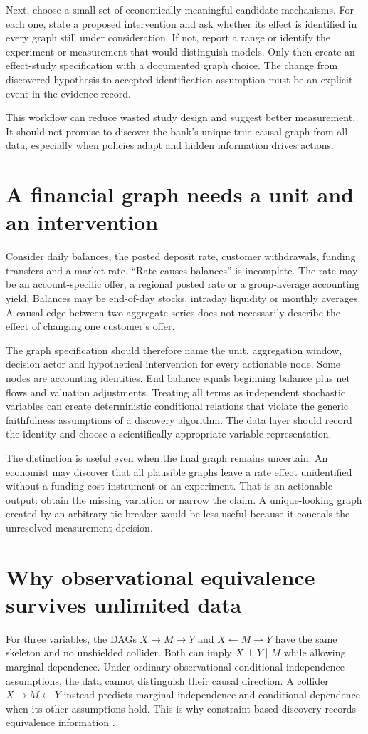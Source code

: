 Next, choose a small set of economically meaningful candidate mechanisms.
For each one, state a proposed intervention and ask whether its effect is
identified in every graph still under consideration. If not, report a range
or identify the experiment or measurement that would distinguish models.
Only then create an effect-study specification with a documented graph
choice. The change from discovered hypothesis to accepted identification
assumption must be an explicit event in the evidence record.

This workflow can reduce wasted study design and suggest better measurement.
It should not promise to discover the bank's unique true causal graph from
all data, especially when policies adapt and hidden information drives actions.

\section{A financial graph needs a unit and an intervention}
Consider daily balances, the posted deposit rate, customer withdrawals,
funding transfers and a market rate. ``Rate causes balances'' is incomplete.
The rate may be an account-specific offer, a regional posted rate or a
group-average accounting yield. Balances may be end-of-day stocks, intraday
liquidity or monthly averages. A causal edge between two aggregate series
does not necessarily describe the effect of changing one customer's offer.

The graph specification should therefore name the unit, aggregation window,
decision actor and hypothetical intervention for every actionable node.
Some nodes are accounting identities. End balance equals beginning balance
plus net flows and valuation adjustments. Treating all terms as independent
stochastic variables can create deterministic conditional relations that
violate the generic faithfulness assumptions of a discovery algorithm.
The data layer should record the identity and choose a scientifically
appropriate variable representation.

The distinction is useful even when the final graph remains uncertain.
An economist may discover that all plausible graphs leave a rate effect
unidentified without a funding-cost instrument or an experiment. That is
an actionable output: obtain the missing variation or narrow the claim.
A unique-looking graph created by an arbitrary tie-breaker would be less
useful because it conceals the unresolved measurement decision.

\section{Why observational equivalence survives unlimited data}
For three variables, the DAGs $X\to M\to Y$ and
$X\leftarrow M\to Y$ have the same skeleton and no unshielded collider.
Both can imply $X\perp Y\mid M$ while allowing marginal dependence.
Under ordinary observational conditional-independence assumptions, the
data cannot distinguish their causal direction. A collider
$X\to M\leftarrow Y$ instead predicts marginal independence and
conditional dependence when its other assumptions hold. This is why
constraint-based discovery records equivalence information
\citep{peters2017,kalisch2007}.

